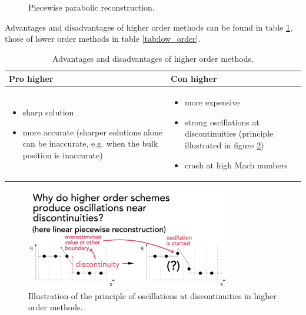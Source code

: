 \begin{figure}[htb!]
    \centering
    
    \caption{Piecewise parabolic reconstruction.}
    \label{fig:ppm}
\end{figure}


Advantages and disadvantages of higher order methods can be found in table \ref{tab:high_order}, those
of lower order methods in table \ref{tab:low_order}.

\begin{table}[htb!]
    \centering
    \begin{tabular}{|p{}|p{}|}
        \hline
        \textcolor{green1}{Pro higher} & \textcolor{red1}{Con higher} \\
        \hline
        \begin{itemize}
            \item sharp solution
            \item more accurate (sharper solutions alone can be inaccurate, e.g. when the bulk position is inaccurate)
        \end{itemize}
        &
        \begin{itemize}
            \item more expensive
            \item strong oscillations at discontinuities (principle illustrated in figure \ref{fig:high_order_oscillations})
            \item crash at high Mach numbers
        \end{itemize} \\
        \hline
    \end{tabular}
    \caption{Advantages and disadvantages of higher order methods.}
    \label{tab:high_order}
\end{table}

\begin{figure}[htb!]
    \centering
    \includegraphics[width=0.8\textwidth]{figures/hoexp.pdf}
    \caption{Illustration of the principle of oscillations at discontinuities in higher order methods.}
    \label{fig:high_order_oscillations}
\end{figure}

